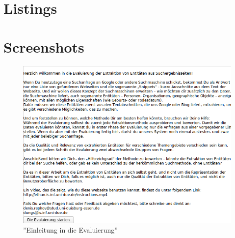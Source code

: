 \chapter{Listings}

\lstset{language=Java}


\lstset{language=Java}


\lstset{language=Java}


\lstset{language=python}


\lstset{language=Java}



\clearpage
\chapter{Screenshots}

\begin{figure}
\centering
\includegraphics[width=1.0\textwidth]{Bilder/evalstep01.png}
\caption{''Einleitung in die Evaluierung''}
\label{app:evalstep01}
\end{figure}


